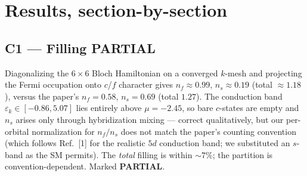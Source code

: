 \documentclass[11pt]{article}
\newcommand{\part}{\textcolor{orange!85!black}{\textbf{PARTIAL}}}
\begin{document}
\section{Results, section-by-section}

\subsection*{C1 --- Filling \hfill \part}
Diagonalizing the $6\times6$ Bloch Hamiltonian on a converged $k$-mesh and projecting the
Fermi occupation onto $c$/$f$ character gives $n_f\approx0.99$, $n_s\approx0.19$ (total
$\approx1.18$), versus the paper's $n_f=0.58$, $n_s=0.69$ (total $1.27$). The conduction
band $\varepsilon_k\in[-0.86,5.07]$ lies entirely above $\mu=-2.45$, so bare $c$-states
are empty and $n_s$ arises only through hybridization mixing --- correct qualitatively,
but our per-orbital normalization for $n_f/n_s$ does not match the paper's counting
convention (which follows Ref.~[1] for the realistic $5d$ conduction band; we substituted
an $s$-band as the SM permits). The \emph{total} filling is within $\sim7\%$; the
partition is convention-dependent. Marked \part.
\end{document}
